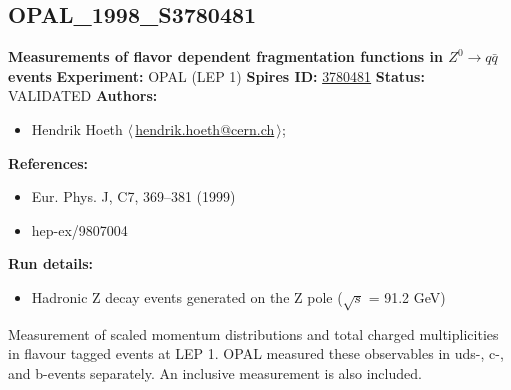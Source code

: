 \subsection[OPAL\_1998\_S3780481]{OPAL\_1998\_S3780481\,\cite{Ackerstaff:1998hz}}
\textbf{Measurements of flavor dependent fragmentation functions in $Z^0 \ensuremath{\to} q \bar{q}$ events}\newline
\textbf{Experiment:} OPAL (LEP 1) \newline
\textbf{Spires ID:} \href{http://www.slac.stanford.edu/spires/find/hep/www?rawcmd=key+3780481}{3780481}\newline
\textbf{Status:} VALIDATED\newline
\textbf{Authors:}
\begin{itemize}
  \item Hendrik Hoeth $\langle\,$\href{mailto:hendrik.hoeth@cern.ch}{hendrik.hoeth@cern.ch}$\,\rangle$;
\end{itemize}
\textbf{References:}
\begin{itemize}
  \item Eur. Phys. J, C7, 369--381 (1999)
  \item hep-ex/9807004
\end{itemize}
\textbf{Run details:}
\begin{itemize}

  \item Hadronic Z decay events generated on the Z pole (\ensuremath{\sqrt{s}} = 91.2 GeV)\end{itemize}

\noindent Measurement of scaled momentum distributions and total charged multiplicities in flavour tagged events at LEP 1. OPAL measured these observables in uds-, c-, and b-events separately. An inclusive measurement is also included.

\clearpage


\clearpage

